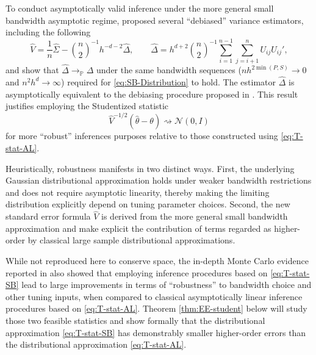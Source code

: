 \documentclass[11pt]{article}
\numberwithin{equation}{section}
\theoremstyle{definition}
\renewcommand{\P}{\mathbb{P}}
\begin{document}
To conduct asymptotically valid inference under the more general small bandwidth asymptotic regime, \citet{Cattaneo-Crump-Jansson_2014a_ET} proposed several ``debiased'' variance estimators, including the following
\begin{equation*}
    \widehat{V} = \frac{1}{n} \widehat{\Sigma} - \binom{n}{2}^{-1}h^{-d-2}\widehat{\Delta},\qquad
    \widehat{\Delta} = h^{d+2}\binom{n}{2}^{-1}\sum_{i=1}^{n-1}\sum_{j=i+1}^{n} U_{ij} U_{ij}',
\end{equation*}
and show that $\widehat{\Delta}\to_\P \Delta$ under the same bandwidth sequences ($nh^{2\min(P,S)}\to 0$ and $n^{2}h^{d}\to \infty$) required for \eqref{eq:SB-Distribution} to hold. The estimator $\widehat{\Delta}$ is asymptotically equivalent to the debiasing procedure proposed in \citet{Efron-Stein_1981_AoS}. This result justifies employing the Studentized statistic
\begin{equation}\label{eq:T-stat-SB}
    \widehat{V}^{-1/2}(\widehat{\theta}-\theta)\rightsquigarrow\mathcal{N}(0,I)
\end{equation}
for more ``robust'' inferences purposes relative to those constructed using \eqref{eq:T-stat-AL}.

Heuristically, robustness manifests in two distinct ways. First, the underlying Gaussian distributional approximation holds under weaker bandwidth restrictions and does not require asymptotic linearity, thereby making the limiting distribution explicitly depend on tuning parameter choices. Second, the new standard error formula $\widehat{V}$ is derived from the more general small bandwidth approximation and make explicit the contribution of terms regarded as higher-order by classical large sample distributional approximations.

While not reproduced here to conserve space, the in-depth Monte Carlo evidence reported in \citet{Cattaneo-Crump-Jansson_2010_JASA,Cattaneo-Crump-Jansson_2014a_ET,Cattaneo-Crump-Jansson_2014b_ET} also showed that employing inference procedures based on \eqref{eq:T-stat-SB} lead to large improvements in terms of ``robustness'' to bandwidth choice and other tuning inputs, when compared to classical asymptotically linear inference procedures based on \eqref{eq:T-stat-AL}. Theorem \ref{thm:EE-student} below will study those two feasible statistics and show formally that the distributional approximation \eqref{eq:T-stat-SB} has demonstrably smaller higher-order errors than the distributional approximation \eqref{eq:T-stat-AL}. 
\end{document}
